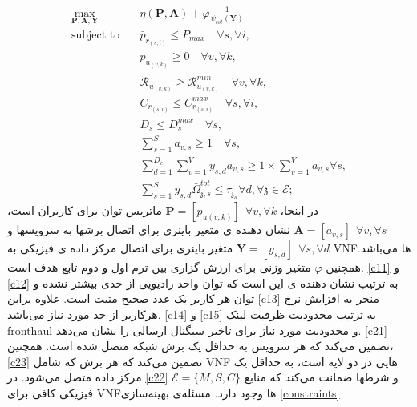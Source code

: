 \begin{subequations}
\begin{alignat}{4}
\max\limits_{\boldsymbol{P}, \boldsymbol{A}, \boldsymbol{Y} }   \quad &  \eta(\boldsymbol{P},\boldsymbol{A})+ \varphi \frac{1}{\psi_{tot}(\boldsymbol{Y})} \\
\text{subject to} \quad  & \bar{p}_{r_{(s,i)}} \leq P_{max} \quad \forall s, \forall i,
 \label{c11} \\
&p_{u_{(v,k)}}  \geq 0  \quad \forall v, \forall k,\label{c12} \\
&\mathcal{R}_{u_{(v,k)}} \geq  \mathcal{R}_{u_{(v,k)}}^{min} \quad \forall v, \forall k,\label{c13} \\
&C_{r_{(s,i)}} \leq C_{r_{(s,i)}}^{max} \quad \forall s, \forall i, \label{c14}\\
&D_{s} \leq D_{s}^{max} \quad \forall s,\label{c15} \\
& \textstyle  \sum_{s=1}^{S}a_{v,s} \geq 1 \quad \forall s, \label{c21} \\
& \textstyle  \sum_{d=1}^{D_c}\sum_{v=1}^{V}y_{s,d}a_{v,s} \geq 1\times\sum_{v=1}^{V}a_{v,s} \forall s,\label{c23} \\
 &\textstyle \sum_{s=1}^{S} y_{s,d} \bar{\Omega}_{\mathfrak{z},s}^{tot}  \leq   \tau_{\mathfrak{z}_d}  \forall d, \forall \mathfrak{z}\in \mathcal{E}; \label{c22}
\end{alignat}
\label{constraints}
\end{subequations}
در اینجا،
$\boldsymbol{P} =[p_{u(v,k)}] \:\: \forall v , \forall k $
ماتریس توان برای کاربران است،
$\boldsymbol{A} =[a_{v,s}] \:\: \forall v , \forall s $
نشان دهنده ی
متغیر باینری برای اتصال برشها به سرویسها و
$\boldsymbol{Y} =[y_{s,d}]  \:\: \forall s ,  \forall d $
متغیر باینری برای اتصال
مرکز داده ی فیزیکی به VNFها می‌باشد.
همچنین
$\varphi$ 
متغیر وزنی برای ارزش گزاری بین ترم اول و دوم تابع هدف است.
\eqref{c11}
و
\eqref{c12}
به ترتیب
نشان دهنده ی این است که توان واحد رادیویی از حدی بیشتر نشده و توان هر کاربر یک عدد صحیح مثبت است.
علاوه براین
\eqref{c13}
منجر به افزایش نرخ هرکاربر از حد مورد نیاز می‌باشد.
 \eqref{c14}
  و 
  \eqref{c15}
  به ترتیب
  محدودیت ظرفیت لینک
  fronthaul 
  و محدودیت مورد نیاز برای تاخیر سیگنال ارسالی
  را نشان می‌دهد.
  \eqref{c21}
 تضمین می‌کند که هر سرویس
 به حداقل یک
 برش شبکه متصل شده است.
همچنین،
\eqref{c23}
تضمین می‌کند که هر برش که شامل VNF هایی در دو لایه است،
به حداقل یک مرکز داده متصل می‌شود.
در \eqref{c22} 
$\mathcal{E} = \{M,S,C\}$ 
و شرطها ضمانت می‌کند که منابع فیزیکی کافی برای VNFها وجود دارد.\newline
مسئله‌ی بهینه‌سازی \eqref{constraints}
